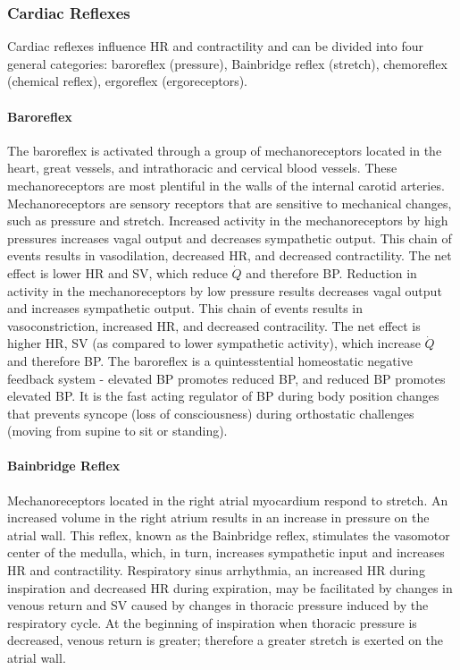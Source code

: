 \subsubsection{Cardiac Reflexes} %
Cardiac reflexes influence HR and contractility and can be divided into four general categories: baroreflex (pressure), Bainbridge reflex (stretch), chemoreflex (chemical reflex), ergoreflex (ergoreceptors). 

\paragraph{Baroreflex}

The baroreflex is activated through a group of mechanoreceptors located in the heart, great vessels, and intrathoracic and cervical blood vessels. These mechanoreceptors are most plentiful in the walls of the internal carotid arteries. Mechanoreceptors are sensory receptors that are sensitive to mechanical changes, such as pressure and stretch. Increased activity in the mechanoreceptors by high pressures increases vagal output and decreases sympathetic output. This chain of events results in vasodilation, decreased HR, and decreased contractility. The net effect is lower HR and SV, which reduce $\dot{Q}$ and therefore BP. Reduction in activity in the mechanoreceptors by low pressure results decreases vagal output and increases sympathetic output. This chain of events results in vasoconstriction, increased HR, and decreased contracility. The net effect is higher HR,  SV (as compared to lower sympathetic activity), which increase $\dot{Q}$ and therefore BP. The baroreflex is a quintesstential homeostatic negative feedback system - elevated BP promotes reduced BP, and reduced BP promotes elevated BP. It is the fast acting regulator of BP during body position changes that prevents syncope (loss of consciousness) during orthostatic challenges  (moving from supine to sit or standing).


\paragraph{Bainbridge Reflex}

Mechanoreceptors located in the right atrial myocardium respond to stretch. An increased volume in the right atrium results in an increase in pressure on the atrial wall. This reflex, known as the Bainbridge reflex, stimulates the vasomotor center of the medulla, which, in turn, increases sympathetic input and increases HR and contractility. Respiratory sinus arrhythmia, an increased HR during inspiration and decreased HR during expiration, may be facilitated by changes in venous return and SV caused by changes in thoracic pressure induced by the respiratory cycle. At the beginning of inspiration when thoracic pressure is decreased, venous return is greater; therefore a greater stretch is exerted on the atrial wall.

